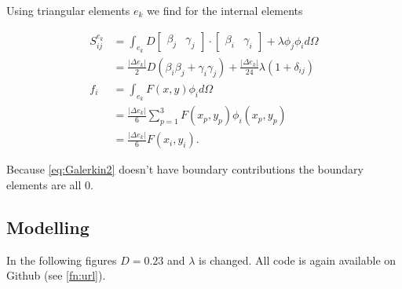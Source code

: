 \documentclass[10pt,a4paper]{article}
\begin{document}
Using triangular elements $e_k$ we find for the internal elements 

\begin{equation}
\begin{split}
S_{ij}^{e_k} &= \int_{e_k} D 
\begin{bmatrix}
\beta_j & \gamma_j
\end{bmatrix} \cdot 
\begin{bmatrix}
\beta_i & \gamma_i
\end{bmatrix} + \lambda \phi_j \phi_i d\Omega \\
&= \frac{|\Delta e_k|}{2} D \left( \beta_i \beta_j + \gamma_i \gamma_j \right) + \frac{|\Delta e_k |}{24} \lambda \left( 1 + \delta_{ij} \right) \\
f_i &= \int_{e_k} F(x,y) \phi_i d\Omega \\
&= \frac{|\Delta e_k|}{6} \sum_{p=1}^3 F(x_p,y_p) \phi_i(x_p,y_p) \\
&= \frac{|\Delta e_k|}{6} F(x_i,y_i).
\end{split}
\end{equation}

Because \cref{eq:Galerkin2} doesn't have boundary contributions the boundary elements are all $0$.

\subsection{Modelling}
In the following figures $D=0.23$ and $\lambda$ is changed. All code is again available on Github (see \cref{fn:url}).
\end{document}
